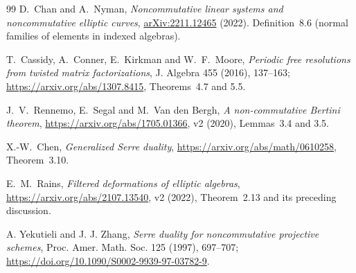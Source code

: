 \documentclass[11pt,a4paper]{ltjsarticle}
\numberwithin{equation}{section}
\begin{document}
\begin{thebibliography}{99}
D.~Chan and A.~Nyman,
\emph{Noncommutative linear systems and noncommutative elliptic curves},
\href{https://arxiv.org/abs/2211.12465}{arXiv:2211.12465} (2022).
Definition~8.6 (normal families of elements in indexed algebras).

T.~Cassidy, A.~Conner, E.~Kirkman and W.~F.~Moore,
\emph{Periodic free resolutions from twisted matrix factorizations},
J. Algebra 455 (2016), 137--163;
\url{https://arxiv.org/abs/1307.8415}, Theorems~4.7 and 5.5.

J.~V.~Rennemo, E.~Segal and M.~Van den Bergh,
\emph{A non-commutative Bertini theorem},
\url{https://arxiv.org/abs/1705.01366}, v2 (2020), Lemmas~3.4 and 3.5.

X.-W.~Chen, \emph{Generalized Serre duality},
\url{https://arxiv.org/abs/math/0610258}, Theorem~3.10.

E.~M.~Rains, \emph{Filtered deformations of elliptic algebras},
\url{https://arxiv.org/abs/2107.13540}, v2 (2022), Theorem~2.13 and its preceding discussion.

A. Yekutieli and J. J. Zhang,
\emph{Serre duality for noncommutative projective schemes},
Proc. Amer. Math. Soc. 125 (1997), 697--707;
\url{https://doi.org/10.1090/S0002-9939-97-03782-9}.

\end{thebibliography}
\end{document}
